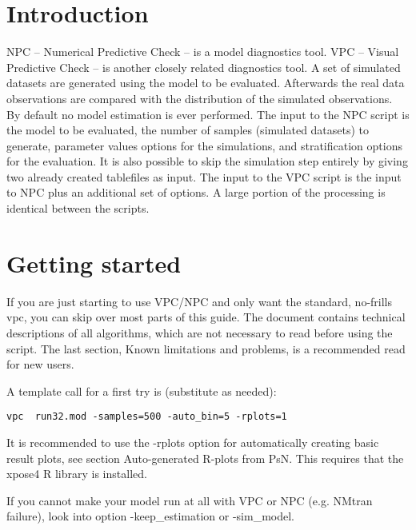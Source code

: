 



\maketitle
\newcommand{\guidetoolname}{vpc}

\section{Introduction}
NPC – Numerical Predictive Check – is a model diagnostics tool. VPC – Visual Predictive Check – is another closely related diagnostics tool. A set of simulated datasets are generated using the model to be evaluated. Afterwards the real data observations are compared with the distribution of the simulated observations. By default no model estimation is ever performed. The input to the NPC script is the model to be evaluated, the number of samples (simulated datasets) to generate, parameter values options for the simulations, and stratification options for the evaluation. It is also possible to skip the simulation step entirely by giving two already created tablefiles as input. The input to the VPC script is the input to NPC plus an additional set of options. A large portion of the processing is identical between the scripts.

\section{Getting started}
If you are just starting to use VPC/NPC and only want the standard, no-frills vpc, you can skip over most parts of this guide. The document contains technical descriptions of all algorithms, which are not necessary to read before using the script. The last section, Known limitations and problems, is a recommended read for new users.

A template call for a first try is (substitute as needed):
\begin{verbatim}
vpc  run32.mod -samples=500 -auto_bin=5 -rplots=1
\end{verbatim}
It is recommended to use the -rplots option for automatically creating basic 
result plots, see section Auto-generated R-plots from PsN. This requires that
the xpose4 R library is installed.

If you cannot make your model run at all with VPC or NPC (e.g. NMtran failure), look into option -keep\_estimation or -sim\_model. 

